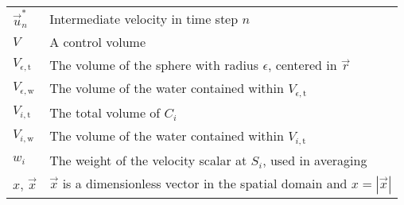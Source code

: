 \begin{center}
\begin{longtabu}{l X}
    $\vec{u}^*_n$       & Intermediate velocity in time step $n$ \\
    $V$                 & A control volume \\
    $V_{\epsilon,\text{t}}$     & The volume of the sphere with radius $\epsilon$,
                                  centered in $\vec{r}$ \\
    $V_{\epsilon,\text{w}}$     & The volume of the water contained within $V_{\epsilon,\text{t}}$ \\
    $V_{i,\text{t}}$    & The total volume of $C_i$ \\
    $V_{i,\text{w}}$    & The volume of the water contained within $V_{i,\text{t}}$ \\
    $w_i$               & The weight of the velocity scalar at $S_i$, used in averaging \\
    $x,\,\vec{x}$       & $\vec{x}$ is a dimensionless vector in the spatial domain
                          and $x = |\vec{x}|$ \\
\end{longtabu}
\end{center}


\begin{center}
\tableoftaa
\end{center}


